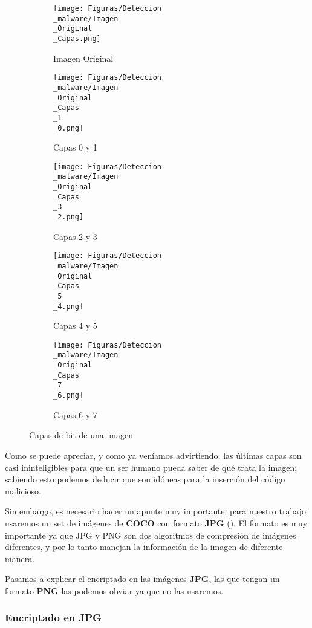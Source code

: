 \begin{figure}[H]
  \centering
  \begin{subfigure}[H]{0.45\linewidth}
  	\texttt{[image: Figuras/Deteccion\\\_malware/Imagen\\\_Original\\\_Capas.png]}
  	\label{fig:Capas}
  	\caption{Imagen Original}
  \end{subfigure}
  \begin{subfigure}[H]{0.45\linewidth}
  	\texttt{[image: Figuras/Deteccion\\\_malware/Imagen\\\_Original\\\_Capas\\\_1\\\_0.png]}
  	\label{fig:Capas23}
  \caption{Capas 0 y 1}
  \end{subfigure}
  \begin{subfigure}[H]{0.45\linewidth}
  	\texttt{[image: Figuras/Deteccion\\\_malware/Imagen\\\_Original\\\_Capas\\\_3\\\_2.png]}
  	\label{fig:Capas23}
  	\caption{Capas 2 y 3}
  \end{subfigure}
  \begin{subfigure}[H]{0.45\linewidth}
  	\texttt{[image: Figuras/Deteccion\\\_malware/Imagen\\\_Original\\\_Capas\\\_5\\\_4.png]}
  	\label{fig:Capas45}
  \caption{Capas 4 y 5}
  \end{subfigure}
  \begin{subfigure}[H]{0.45\linewidth}
  	\texttt{[image: Figuras/Deteccion\\\_malware/Imagen\\\_Original\\\_Capas\\\_7\\\_6.png]}
  	\label{fig:Capas67}
  \caption{Capas 6 y 7}
  \end{subfigure}
  \caption{Capas de bit de una imagen}
\end{figure}

Como se puede apreciar, y como ya veníamos advirtiendo, las últimas capas son casi ininteligibles para que un ser humano pueda saber de qué trata la imagen; sabiendo esto podemos deducir que son idóneas para la inserción del código malicioso.

Sin embargo, es necesario hacer un apunte muy importante: para nuestro trabajo usaremos un set de imágenes de \textbf{COCO} con formato \textbf{JPG} (\cite{coco}). El formato es muy importante ya que JPG y PNG son dos algoritmos de compresión de imágenes diferentes, y por lo tanto manejan la información de la imagen de diferente manera. %

Pasamos a explicar el encriptado en las imágenes \textbf{JPG}, las que tengan un formato \textbf{PNG} las podemos obviar ya que no las usaremos.

\subsubsection{Encriptado en JPG}

